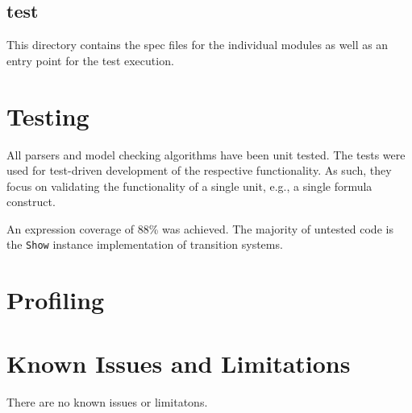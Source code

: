 \documentclass[11pt]{article}
\begin{document}
\subsection{test}

This directory contains the spec files for the individual modules as well as an entry point for the test execution.

\section{Testing}


All parsers and model checking algorithms have been unit tested.
The tests were used for test-driven development of the respective functionality.
As such, they focus on validating the functionality of a single unit, e.g., a single formula construct.

An expression coverage of 88\% was achieved.
The majority of untested code is the \verb|Show| instance implementation of transition systems. 

\section{Profiling}


\section{Known Issues and Limitations}

There are no known issues or limitatons.
\end{document}
